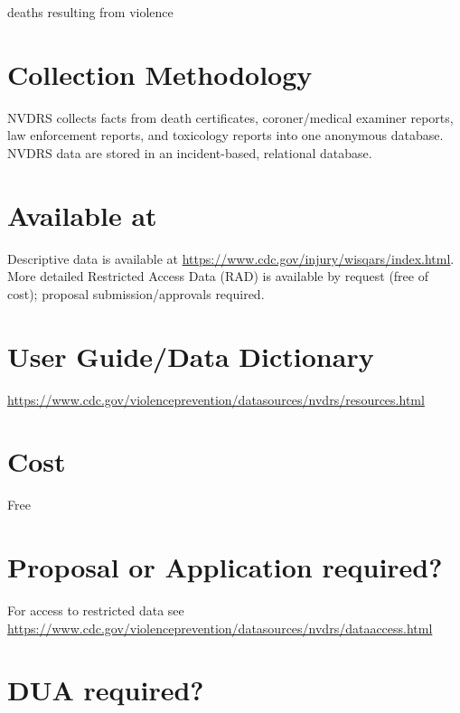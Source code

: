 \documentclass[
]{book}
\begin{document}
deaths resulting from violence

\hypertarget{collection-methodology-66}{%
\section{Collection Methodology}\label{collection-methodology-66}}

NVDRS collects facts from death certificates, coroner/medical examiner reports, law enforcement reports, and toxicology reports into one anonymous database. NVDRS data are stored in an incident-based, relational database.

\hypertarget{available-at-66}{%
\section{Available at}\label{available-at-66}}

Descriptive data is available at \url{https://www.cdc.gov/injury/wisqars/index.html}. More detailed Restricted Access Data (RAD) is available by request (free of cost); proposal submission/approvals required.

\hypertarget{user-guidedata-dictionary-66}{%
\section{User Guide/Data Dictionary}\label{user-guidedata-dictionary-66}}

\url{https://www.cdc.gov/violenceprevention/datasources/nvdrs/resources.html}

\hypertarget{cost-66}{%
\section{Cost}\label{cost-66}}

Free

\hypertarget{proposal-or-application-required-66}{%
\section{Proposal or Application required?}\label{proposal-or-application-required-66}}

For access to restricted data see \url{https://www.cdc.gov/violenceprevention/datasources/nvdrs/dataaccess.html}

\hypertarget{dua-required-66}{%
\section{DUA required?}\label{dua-required-66}}
\end{document}
